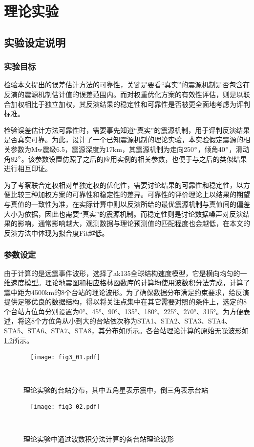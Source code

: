 

\chapter{理论实验}

\section{实验设定说明}
\subsection{实验目标}
检验本文提出的误差估计方法的可靠性，关键是要看“真实”的震源机制是否包含在反演的震源机制估计值的误差范围内。而对权重优化方案的有效性评估，则是以联合加权相比于独立加权，其反演结果的稳定性和可靠性是否被更全面地考虑为评判标准。

检验误差估计方法可靠性时，需要事先知道“真实”的震源机制，用于评判反演结果是否真实可靠。为此，设计了一个已知震源机制的理论实验，本实验假定震源的相关参数为Mw震级6.5，震源深度为17km，其震源机制为走向250$^\circ$，倾角40$^\circ$，滑动角82$^\circ$。该参数设置仿照了之后的应用实例的相关参数，也便于与之后的类似结果进行相互印证。

为了考察联合定权相对单独定权的优化性，需要讨论结果的可靠性和稳定性，以方便比较三种加权方案的可靠性和稳定性的差异。可靠性的评价理论上以结果的期望与真值的一致性为准，在实际计算中则以反演所给的最优震源机制与真值间的偏差大小为依据，因此也需要“真实”的震源机制。而稳定性则是讨论数据噪声对反演结果的影响，通常影响越大，观测数据与理论预测值的匹配程度也会越低，在本文的反演方法中体现为拟合度Fit越低。

\subsection{参数设定}
由于计算的是远震事件波形，选择了ak135全球结构速度模型\citep{Kennett1995}，它是横向均匀的一维速度模型。理论地震图和相应格林函数库的计算均使用波数积分法完成，计算了震中距为4500km的8个台站的理论波形。为了确保数据分布满足约束要求，给反演提供足够优良的数据结构，得以将关注点集中在其它需要对照的条件上，选定的8个台站方位角分别设置为0°、45°、90°、135°、180°、225°、270°、315°。为方便表述，将这8个方位角从小到大的台站依次称为STA1、STA2、STA3、STA4、STA5、STA6、STA7、STA8，其分布如所示。各台站理论计算的原始无噪波形如\ref{fig3_02}所示。
\begin{figure}
\centering
  \texttt{[image: fig3\_01.pdf]}
  \caption{理论实验的台站分布，其中五角星表示震中，倒三角表示台站}
  \label{fig3_01}
\end{figure}
\begin{figure}
\centering
  \texttt{[image: fig3\_02.pdf]}
  \caption{理论实验中通过波数积分法计算的各台站理论波形}
  \label{fig3_02}
\end{figure}


